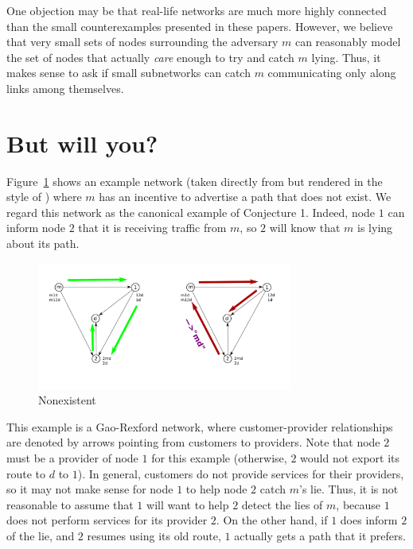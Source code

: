 \documentclass[12pt]{article}
\begin{document}
    One objection may be that real-life networks are much more highly
    connected than the small counterexamples presented in these papers.
    However, we believe that very small sets of nodes surrounding
    the adversary $m$ can reasonably model the set of nodes
    that actually \emph{care} enough to try and catch $m$ lying.
    Thus, it makes sense to ask if small subnetworks can catch $m$
    communicating only along links among themselves.


\section{But will you?}
  Figure~\ref{fig:Nonexistent} shows an example network
  (taken directly from \cite{RoutingGames}
  but rendered in the style of \cite{Attraction})
  where $m$ has an incentive to advertise a path that does not exist.
  We regard this network as the canonical example of Conjecture 1.
  Indeed, node $1$ can inform node $2$ that it is receiving traffic
  from $m$, so $2$ will know that $m$ is lying about its path.
  \begin{figure}[h]
    \centering
    \caption{Nonexistent}\label{fig:Nonexistent}
    \includegraphics[width=0.75\textwidth]{NonexistentBetter}
  \end{figure}

  This example is a Gao-Rexford network, where customer-provider
  relationships are denoted by arrows pointing from customers to providers.
  Note that node $2$ must be a provider of node $1$ for this example
  (otherwise, $2$ would not export its route to $d$ to $1$).
  In general, customers do not provide services for their providers,
  so it may not make sense for node $1$ to help node $2$ catch $m$'s lie.
  Thus, it is not reasonable to assume that $1$ will want to help
  $2$ detect the lies of $m$, because $1$ does not perform services
  for its provider $2$.
  On the other hand, if $1$ does inform $2$ of the lie, and $2$ resumes
  using its old route, $1$ actually gets a path that it prefers.
\end{document}
